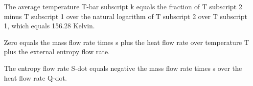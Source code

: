 The average temperature T-bar subscript k equals the fraction of T subscript 2 minus T subscript 1 over the natural logarithm of T subscript 2 over T subscript 1, which equals 156.28 Kelvin.

Zero equals the mass flow rate times s plus the heat flow rate over temperature T plus the external entropy flow rate.

The entropy flow rate S-dot equals negative the mass flow rate times s over the heat flow rate Q-dot.